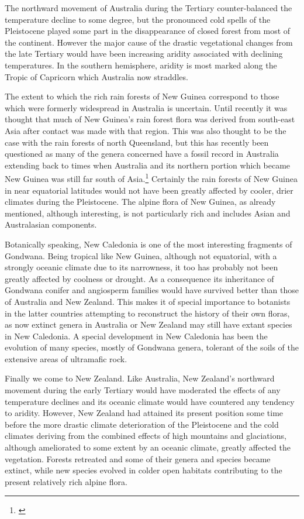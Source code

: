 The northward movement of Australia during the Tertiary counter-balanced the temperature decline to some degree, but the pronounced cold spells of the Pleistocene played some part in the disappearance of closed forest from most of the continent.
However the major cause of the drastic vegetational changes from the late Tertiary would have been increasing aridity associated with declining temperatures.
In the southern hemisphere, aridity is most marked along the Tropic of Capricorn which Australia now straddles.

The extent to which the rich rain forests of New Guinea correspond to those which were formerly widespread in Australia is uncertain.
Until recently it was thought that much of New Guinea's rain forest flora was derived from south-east Asia after contact was made with that region.
This was also thought to be the case with the rain forests of north Queensland, but this has recently been questioned as many of the genera concerned have a fossil record in Australia extending back to times when Australia and its northern portion which became New Guinea was still far south of Asia.\footnote{\cite{webb1986recent}}
Certainly the rain forests of New Guinea in near equatorial latitudes would not have been greatly affected by cooler, drier climates during the Pleistocene.
The alpine flora of New Guinea, as already mentioned, although interesting, is not particularly rich and includes Asian and Australasian components.

Botanically speaking, New Caledonia is one of the most interesting fragments of Gondwana.
Being tropical like New Guinea, although not equatorial, with a strongly oceanic climate due to its narrowness, it too has probably not been greatly affected by coolness or drought.
As a consequence its inheritance of Gondwana conifer and angiosperm families would have survived better than those of Australia and New Zealand.
This makes it of special importance to botanists in the latter countries attempting to reconstruct the history of their own floras, as now extinct genera in Australia or New Zealand may still have extant species in New Caledonia.
A special development in New Caledonia has been the evolution of many species, mostly of Gondwana genera, tolerant of the soils of the extensive areas of ultramafic rock.

Finally we come to New Zealand.
Like Australia, New Zealand's northward movement during the early Tertiary would have moderated the effects of any temperature declines and its oceanic climate would have countered any tendency to aridity.
However, New Zealand had attained its present position some time before the more drastic climate deterioration of the Pleistocene and the cold climates deriving from the combined effects of high mountains and glaciations, although ameliorated to some extent by an oceanic climate, greatly affected the vegetation.
Forests retreated and some of their genera and species became extinct, while new species evolved in colder open habitats contributing to the present relatively rich alpine flora.

